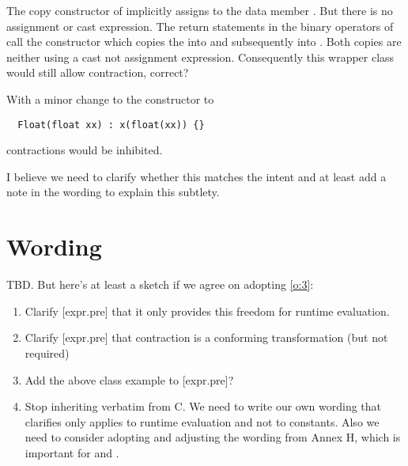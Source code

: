 The copy constructor of  implicitly assigns to the data member .
But there is no assignment or cast expression.
The return statements in the binary operators of  call the
 constructor which copies the  into 
and subsequently into .
Both copies are neither using a cast not assignment expression.
Consequently this wrapper class would still allow \fp contraction, correct?

With a minor change to the  constructor to
\medskip
\begin{lstlisting}
  Float(float xx) : x(float(xx)) {}
\end{lstlisting}
\fp contractions would be inhibited.

I believe we need to clarify whether this matches the intent and at least
add a note in the wording to explain this subtlety.



\section{Wording}

TBD.
But here's at least a sketch if we agree on adopting \ref{o:3}:

\begin{enumerate}
  \item Clarify [expr.pre] that it only provides this freedom for runtime
    evaluation.

  \item Clarify [expr.pre] that \fp contraction is a conforming transformation
    (but not required)

  \item Add the above  class example to [expr.pre]?

  \item Stop inheriting  verbatim from C.
    We need to write our own wording that clarifies  only
    applies to runtime evaluation and not to constants.
    Also we need to consider adopting and adjusting the wording from Annex H,
    which is important for  and .
\end{enumerate}


